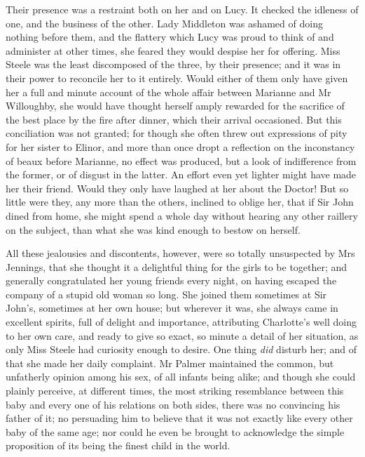Their presence was a restraint both on her and on Lucy. It checked the idleness of one, and the business of the other. Lady Middleton was ashamed of doing nothing before them, and the flattery which Lucy was proud to think of and administer at other times, she feared they would despise her for offering. Miss Steele was the least discomposed of the three, by their presence; and it was in their power to reconcile her to it entirely. Would either of them only have given her a full and minute account of the whole affair between Marianne and Mr Willoughby, she would have thought herself amply rewarded for the sacrifice of the best place by the fire after dinner, which their arrival occasioned. But this conciliation was not granted; for though she often threw out expressions of pity for her sister to Elinor, and more than once dropt a reflection on the inconstancy of beaux before Marianne, no effect was produced, but a look of indifference from the former, or of disgust in the latter. An effort even yet lighter might have made her their friend. Would they only have laughed at her about the Doctor! But so little were they, any more than the others, inclined to oblige her, that if Sir John dined from home, she might spend a whole day without hearing any other raillery on the subject, than what she was kind enough to bestow on herself.

All these jealousies and discontents, however, were so totally unsuspected by Mrs Jennings, that she thought it a delightful thing for the girls to be together; and generally congratulated her young friends every night, on having escaped the company of a stupid old woman so long. She joined them sometimes at Sir John’s, sometimes at her own house; but wherever it was, she always came in excellent spirits, full of delight and importance, attributing Charlotte’s well doing to her own care, and ready to give so exact, so minute a detail of her situation, as only Miss Steele had curiosity enough to desire. One thing \textit{did} disturb her; and of that she made her daily complaint. Mr Palmer maintained the common, but unfatherly opinion among his sex, of all infants being alike; and though she could plainly perceive, at different times, the most striking resemblance between this baby and every one of his relations on both sides, there was no convincing his father of it; no persuading him to believe that it was not exactly like every other baby of the same age; nor could he even be brought to acknowledge the simple proposition of its being the finest child in the world.

